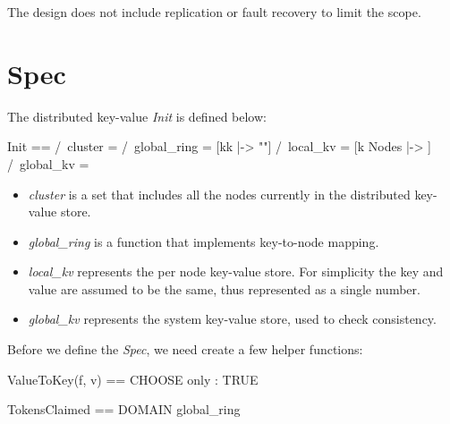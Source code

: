 The design does not include replication or fault recovery to limit the scope.

\section{Spec}

The distributed key-value \textit{Init} is defined below:\\

\begin{tla}
Init ==
    /\ cluster = {}
    /\ global_ring = [kk \in {} |-> ""]
    /\ local_kv = [k \in Nodes |-> {}]
    /\ global_kv = {}
\end{tla}
\begin{tlatex}
%
%
%
\end{tlatex}

\begin{itemize}
    \item \textit{cluster} is a set that includes all the nodes currently in the distributed key-value store.
    \item \textit{global\_ring} is a function that implements key-to-node mapping.
    \item \textit{local\_kv} represents the per node key-value store. For
    simplicity the key and value are assumed to be the same, thus represented
    as a single number.
    \item \textit{global\_kv} represents the system key-value store, used to check consistency.
\end{itemize}

Before we define the \textit{Spec}, we need create a few helper functions:\\
\begin{tla}
ValueToKey(f, v) == 
    CHOOSE only : TRUE

TokensClaimed == 
    DOMAIN global_ring
\end{tla}
\begin{tlatex}
%
\@pvspace{8.0pt}%
%
%
\end{tlatex}
\\

